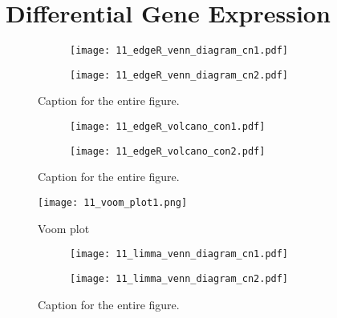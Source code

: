 \section{Differential Gene Expression}

\begin{figure}[H]
    \centering
    \begin{subfigure}[b]{0.45\textwidth} 
        \centering
        \texttt{[image: 11\_edgeR\_venn\_diagram\_cn1.pdf]} 
        \caption{}
        \label{fig:venn_edgeR_1}
    \end{subfigure}
    \hfill %
    \begin{subfigure}[b]{0.45\textwidth} %
        \centering
        \texttt{[image: 11\_edgeR\_venn\_diagram\_cn2.pdf]} %
        \caption{}
        \label{fig:venn_edgeR_2}
    \end{subfigure}
    \caption{Caption for the entire figure.}
    \label{fig:venn_edgeR}
\end{figure}

\begin{figure}[H]
    \centering
    \begin{subfigure}[b]{0.45\textwidth} 
        \centering
        \texttt{[image: 11\_edgeR\_volcano\_con1.pdf]} 
        \caption{}
        \label{fig:vol_edgeR_1}
    \end{subfigure}
    \hfill %
    \begin{subfigure}[b]{0.45\textwidth} %
        \centering
        \texttt{[image: 11\_edgeR\_volcano\_con2.pdf]} %
        \caption{}
        \label{fig:vol_edgeR_2}
    \end{subfigure}
    \caption{Caption for the entire figure.}
    \label{fig:vol_edgeR}
\end{figure}

\begin{figure}[H]
  \center
  \texttt{[image: 11\_voom\_plot1.png]}
  \caption{Voom plot}\label{fig:voom}
\end{figure}


\begin{figure}[H]
    \centering
    \begin{subfigure}[b]{0.45\textwidth} 
        \centering
        \texttt{[image: 11\_limma\_venn\_diagram\_cn1.pdf]} 
        \caption{}
        \label{fig:venn_limma_1}
    \end{subfigure}
    \hfill %
    \begin{subfigure}[b]{0.45\textwidth} %
        \centering
        \texttt{[image: 11\_limma\_venn\_diagram\_cn2.pdf]} %
        \caption{}
        \label{fig:venn_limma_2}
    \end{subfigure}
    \caption{Caption for the entire figure.}
    \label{fig:venn_limma}
\end{figure}

